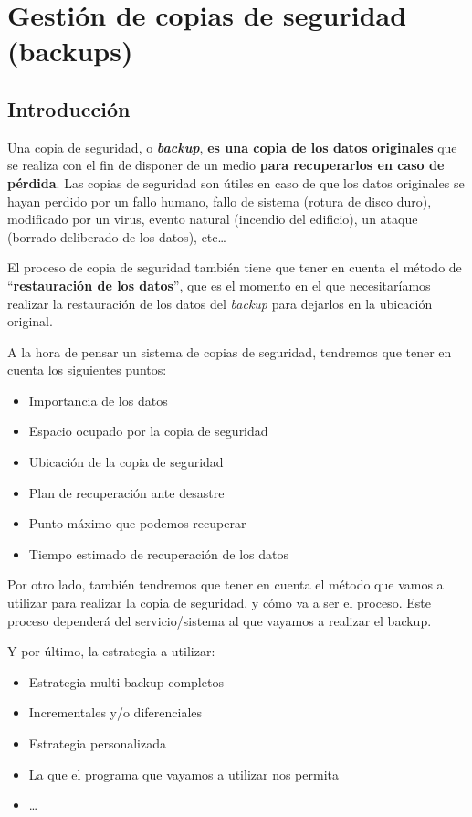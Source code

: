 \hypertarget{gestion_copias_de_seguridad}{}
\chapter{Gestión de copias de seguridad (backups)}

\section{Introducción}

Una copia de seguridad, o \textbf{\textit{backup}}, \textbf{es una copia de los datos originales} que se realiza con el fin de disponer de un medio \textbf{para recuperarlos en caso de pérdida}. Las copias de seguridad son útiles en caso de que los datos originales se hayan perdido por un fallo humano, fallo de sistema (rotura de disco duro), modificado por un virus,  evento natural (incendio del edificio), un ataque (borrado deliberado de los datos), etc…

El proceso de copia de seguridad también tiene que tener en cuenta el método de “\textbf{restauración de los datos}”, que es el momento en el que necesitaríamos realizar la restauración de los datos del \textit{backup} para dejarlos en la ubicación original.

A la hora de pensar un sistema de copias de seguridad, tendremos que tener en cuenta los siguientes puntos:

\begin{itemize}
    \item Importancia de los datos
    \item Espacio ocupado por la copia de seguridad
    \item Ubicación de la copia de seguridad
    \item Plan de recuperación ante desastre
    \item Punto máximo que podemos recuperar
    \item Tiempo estimado de recuperación de los datos
\end{itemize}

Por otro lado, también tendremos que tener en cuenta el método que vamos a utilizar para realizar la copia de seguridad, y cómo va a ser el proceso. Este proceso dependerá del servicio/sistema al que vayamos a realizar el backup.

Y por último, la estrategia a utilizar:

\begin{itemize}
    \item Estrategia multi-backup completos
    \item Incrementales y/o diferenciales
    \item Estrategia personalizada
    \item La que el programa que vayamos a utilizar nos permita
    \item …
\end{itemize}

